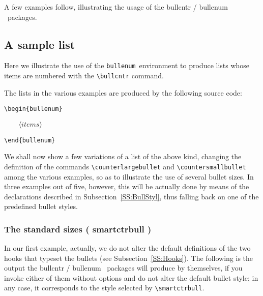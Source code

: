 \documentclass[a4paper]{article}
\DeclareRobustCommand*{\command}[1]{%
	{\texorpdfstring{\normalfont\ttfamily \char\escapechar}{\pdfbslash}#1}%
}
\DeclareRobustCommand*{\packlass}[1]{%
	{\texorpdfstring{\normalfont \sffamily}{}#1}%
}
\DeclareRobustCommand*{\meta}[1]{\mbox{\(\langle\textit{#1}\rangle\)}}
\DeclareRobustCommand*{\env}[1]{\texttt{#1}}
\newcommand*{\Bullcntr}{bullcntr}
\newcommand*{\bull}{\packlass{\Bullcntr}}
\newcommand*{\Bullenum}{bullenum}
\newcommand*{\benu}{\packlass{\Bullenum}}
\newcommand*{\beenv}{\env{\Bullenum}}
\newcommand*{\pdfbslash}{}
{\catcode`\|=0 |catcode`|\=12 |gdef|pdfbslash{\\}}
\begin{document}
A few examples follow, illustrating the usage of the \bull\slash\benu\
packages.



\subsection{A sample list}

Here we illustrate the use of the \beenv\ environment to produce lists
whose items are numbered with the \verb|\bullcntr| command.

The lists in the various examples are produced by the following source
code:
%
\begin{verbatim}
\begin{bullenum}
\end{verbatim}
\begin{flushleft}
\texttt{\ \ \ \ }\meta{items}
\end{flushleft}
\begin{verbatim}
\end{bullenum}
\end{verbatim}
%

We shall now show a few variations of a list of the above kind,
changing the definition of the commands \verb|\counterlargebullet| and
\verb|\countersmallbullet| among the various examples, so as to
illustrate the use of several bullet sizes.  In three examples out of
five, however, this will be actually done by means of the declarations
described in Subsection~\ref{SS:BullStyl}, thus falling back on one of
the predefined bullet styles.



\subsubsection{The standard sizes (\command{smartctrbull})}
\label{SSS:Xmp-Standard}

In our first example, actually, we do not alter the default
definitions of the two hooks that typeset the bullets (see
Subsection~\ref{SS:Hooks}).  The following is the output the
\bull\slash\benu\ packages will produce by themselves, if you invoke
either of them without options and do not alter the default bullet
style; in any case, it corresponds to the style selected by
\verb|\smartctrbull|.
\end{document}
